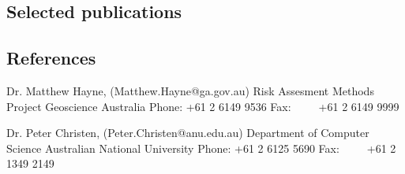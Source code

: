 \documentclass[12pt,a4paper]{article}
\begin{document}
%
%
%

%
%
\subsection*{Selected publications}


%

%


\newpage
\subsection*{References}

\noindent Dr. Matthew Hayne, (Matthew.Hayne@ga.gov.au)\newline
Risk Assesment Methods Project  \newline
Geoscience Australia \newline
Phone: +61 2 6149 9536 \newline
Fax:\ \ \ \ \   +61 2 6149 9999 \newline

\noindent Dr. Peter Christen, (Peter.Christen@anu.edu.au)\newline
Department of Computer Science  \newline
Australian National University \newline
Phone: +61 2 6125 5690 \newline
Fax:\ \ \ \ \   +61 2 1349 2149 \newline
\end{document}
